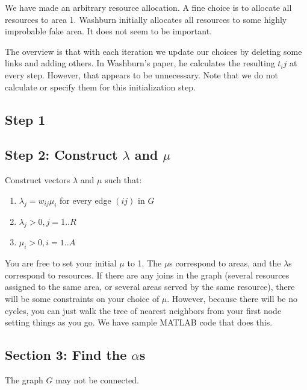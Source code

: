 We have made an arbitrary resource allocation. A fine choice is to
allocate all resources to area 1. Washburn initially allocates all
resources to some highly improbable fake area. It does not seem to be
important. 

The overview is that with each iteration we update our choices by
deleting some links and adding others. In Washburn's paper, he
calculates the resulting $t_ij$ at every step. However, that appears
to be unnecessary. Note that we do not calculate or specify them for
this initialization step.


\subsection{Step 1}
\label{sec:step1}


\subsection{Step 2: Construct $\lambda$ and $\mu$}
\label{sec:step2}
Construct vectors $\lambda$ and $\mu$ such that:
\begin{enumerate}
\item $\lambda_j = w_{ij}\mu_i$ for every edge $(ij)$ in $G$
\item $\lambda_j > 0, j = 1..R$
\item $\mu_i > 0, i = 1..A$
\end{enumerate}
You are free to set your initial $\mu$ to 1. The $\mu$s correspond to
areas, and the $\lambda$s correspond to resources. If there are any
joins in the graph (several resources assigned to the same area, or
several areas served by the same resource), there will be some
constraints on your choice of $\mu$. However, because there will be no
cycles, you can just walk the tree of nearest neighbors from your
first node setting things as you go. We have sample MATLAB code that
does this.


\subsection{Section 3: Find the $\alpha$s}
\label{sec:alpha}

The graph $G$ may not be connected.



